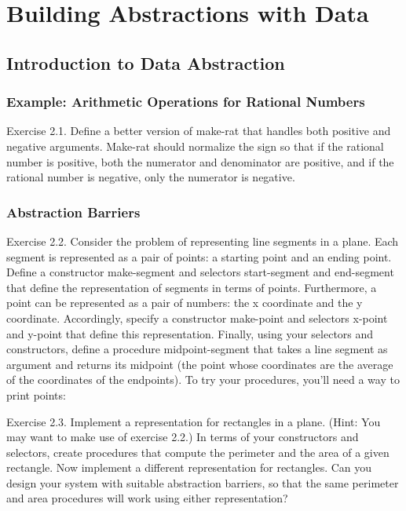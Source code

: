 %

    \section{Building Abstractions with Data}
        \subsection{Introduction to Data Abstraction}
            \subsubsection{Example: Arithmetic Operations for Rational Numbers}
Exercise 2.1. Define a better version of make-rat that handles both positive and negative arguments. Make-rat should normalize the sign so that if the rational number is positive, both the numerator and denominator are positive, and if the rational number is negative, only the numerator is negative.
            \subsubsection{Abstraction Barriers}

Exercise 2.2. Consider the problem of representing line segments in a plane. Each segment is represented as a pair of points: a starting point and an ending point. Define a constructor make-segment and selectors start-segment and end-segment that define the representation of segments in terms of points. Furthermore, a point can be represented as a pair of numbers: the x coordinate and the y coordinate. Accordingly, specify a constructor make-point and selectors x-point and y-point that define this representation. Finally, using your selectors and constructors, define a procedure midpoint-segment that takes a line segment as argument and returns its midpoint (the point whose coordinates are the average of the coordinates of the endpoints).  To try your procedures, you'll need a way to print points:


Exercise 2.3. Implement a representation for rectangles in a plane. (Hint: You may want to make use of exercise 2.2.) In terms of your constructors and selectors, create procedures that compute the perimeter and the area of a given rectangle. Now implement a different representation for rectangles.  Can you design your system with suitable abstraction barriers, so that the same perimeter and area procedures will work using either representation?

